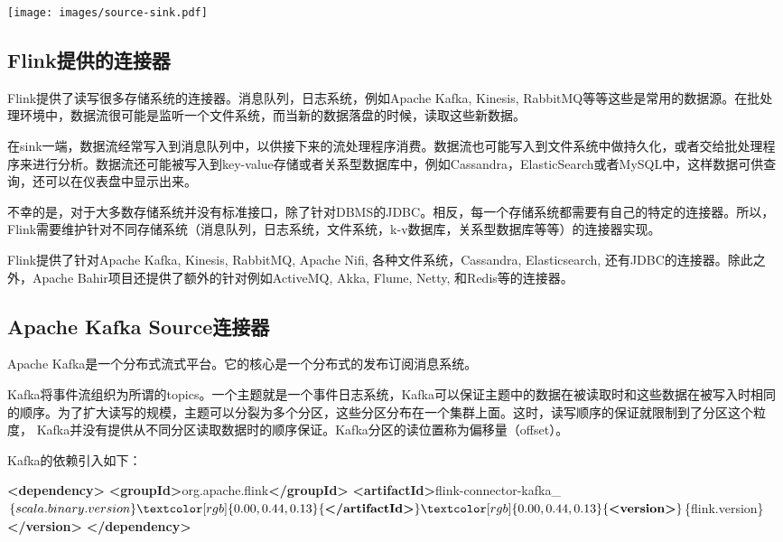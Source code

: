 \documentclass[cn,11pt,chinese]{elegantbook}
\newenvironment{Shaded}{}{}
\newcommand{\KeywordTok}[1]{\textcolor[rgb]{0.00,0.44,0.13}{\textbf{#1}}}
\newcommand{\NormalTok}[1]{#1}
\begin{document}
\texttt{[image: images/source-sink.pdf]}

\hypertarget{flinkux63d0ux4f9bux7684ux8fdeux63a5ux5668}{%
\subsection{Flink提供的连接器}\label{flinkux63d0ux4f9bux7684ux8fdeux63a5ux5668}}

Flink提供了读写很多存储系统的连接器。消息队列，日志系统，例如Apache
Kafka, Kinesis,
RabbitMQ等等这些是常用的数据源。在批处理环境中，数据流很可能是监听一个文件系统，而当新的数据落盘的时候，读取这些新数据。

在sink一端，数据流经常写入到消息队列中，以供接下来的流处理程序消费。数据流也可能写入到文件系统中做持久化，或者交给批处理程序来进行分析。数据流还可能被写入到key-value存储或者关系型数据库中，例如Cassandra，ElasticSearch或者MySQL中，这样数据可供查询，还可以在仪表盘中显示出来。

不幸的是，对于大多数存储系统并没有标准接口，除了针对DBMS的JDBC。相反，每一个存储系统都需要有自己的特定的连接器。所以，Flink需要维护针对不同存储系统（消息队列，日志系统，文件系统，k-v数据库，关系型数据库等等）的连接器实现。

Flink提供了针对Apache Kafka, Kinesis, RabbitMQ, Apache Nifi,
各种文件系统，Cassandra, Elasticsearch,
还有JDBC的连接器。除此之外，Apache
Bahir项目还提供了额外的针对例如ActiveMQ, Akka, Flume, Netty,
和Redis等的连接器。

\hypertarget{apache-kafka-sourceux8fdeux63a5ux5668}{%
\subsection{Apache Kafka
Source连接器}\label{apache-kafka-sourceux8fdeux63a5ux5668}}

Apache
Kafka是一个分布式流式平台。它的核心是一个分布式的发布订阅消息系统。

Kafka将事件流组织为所谓的topics。一个主题就是一个事件日志系统，Kafka可以保证主题中的数据在被读取时和这些数据在被写入时相同的顺序。为了扩大读写的规模，主题可以分裂为多个分区，这些分区分布在一个集群上面。这时，读写顺序的保证就限制到了分区这个粒度，
Kafka并没有提供从不同分区读取数据时的顺序保证。Kafka分区的读位置称为偏移量（offset）。

Kafka的依赖引入如下：

\begin{Shaded}
\begin{Highlighting}[]
\KeywordTok{\textless{}dependency\textgreater{}}
   \KeywordTok{\textless{}groupId\textgreater{}}\NormalTok{org.apache.flink}\KeywordTok{\textless{}/groupId\textgreater{}}
   \KeywordTok{\textless{}artifactId\textgreater{}}\NormalTok{flink{-}connector{-}kafka\_$\{scala.binary.version\}}\KeywordTok{\textless{}/artifactId\textgreater{}}
   \KeywordTok{\textless{}version\textgreater{}}\NormalTok{$\{flink.version\}}\KeywordTok{\textless{}/version\textgreater{}}
\KeywordTok{\textless{}/dependency\textgreater{}}
\end{Highlighting}
\end{Shaded}
\end{document}
